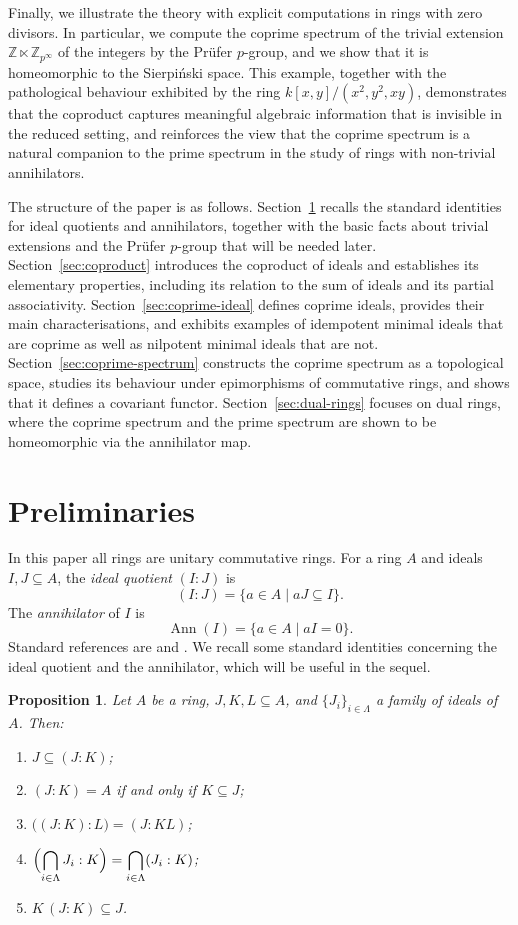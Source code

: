 \documentclass{amsart}
\newtheorem{proposition}{Proposition}
\DeclareMathOperator{\ann}{Ann}
\begin{document}
Finally, we illustrate the theory with explicit computations in rings with zero divisors. In particular, we compute the coprime spectrum of the trivial extension $\mathbb{Z}\ltimes \mathbb{Z}_{p^\infty}$ of the integers by the Pr\"ufer $p$-group, and we show that it is homeomorphic to the Sierpi\'nski space. This example, together with the pathological behaviour exhibited by the ring $k[x,y]/(x^2,y^2,xy)$, demonstrates that the coproduct captures meaningful algebraic information that is invisible in the reduced setting, and reinforces the view that the coprime spectrum is a natural companion to the prime spectrum in the study of rings with non-trivial annihilators.

The structure of the paper is as follows. Section~\ref{sec:prelim} recalls the standard identities for ideal quotients and annihilators, together with the basic facts about trivial extensions and the Pr\"ufer $p$-group that will be needed later. Section~\ref{sec:coproduct} introduces the coproduct of ideals and establishes its elementary properties, including its relation to the sum of ideals and its partial associativity. Section~\ref{sec:coprime-ideal} defines coprime ideals, provides their main characterisations, and exhibits examples of idempotent minimal ideals that are coprime as well as nilpotent minimal ideals that are not. Section~\ref{sec:coprime-spectrum} constructs the coprime spectrum as a topological space, studies its behaviour under epimorphisms of commutative rings, and shows that it defines a covariant functor. Section~\ref{sec:dual-rings} focuses on dual rings, where the coprime spectrum and the prime spectrum are shown to be homeomorphic via the annihilator map.

\section{Preliminaries}
\label{sec:prelim}

In this paper all rings are unitary commutative rings. For a ring $A$ and ideals $I,J\subseteq A$, the \emph{ideal quotient} $(I:J)$ is
\[
(I:J)=\{a\in A\mid aJ\subseteq I\}.
\]
The \emph{annihilator} of $I$ is
\[
\ann(I)=\{a\in A\mid aI=0\}.
\]
Standard references are \cite{atiyah2018introduction} and \cite{greuel2008singular}. We recall some standard identities concerning the ideal quotient and the annihilator, which will be useful in the sequel.

\begin{proposition}\label{pro:quotient}
Let $A$ be a ring, $J,K,L\subseteq A$, and $\{J_i\}_{i\in\Lambda}$ a family of ideals of $A$. Then:
\begin{enumerate}
  \item $J\subseteq (J:K)$;
  \item $(J:K)=A$ if and only if $K\subseteq J$;
  \item $\bigl((J:K):L\bigr)=(J:KL)$;
  \item $\displaystyle\Bigl(\bigcap_{i\in\Lambda} J_i:K\Bigr)=\bigcap_{i\in\Lambda}(J_i:K)$;
  \item $K\,(J:K)\subseteq J$.
\end{enumerate}
\end{proposition}
\end{document}

